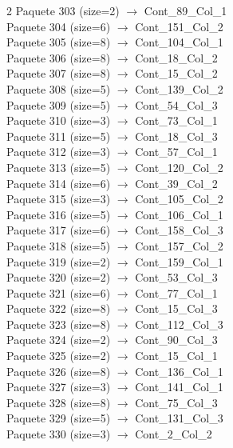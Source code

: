 \begin{multicols}{2}
Paquete 303 (size=2) $\rightarrow$ Cont\_89\_Col\_1\\
Paquete 304 (size=6) $\rightarrow$ Cont\_151\_Col\_2\\
Paquete 305 (size=8) $\rightarrow$ Cont\_104\_Col\_1\\
Paquete 306 (size=8) $\rightarrow$ Cont\_18\_Col\_2\\
Paquete 307 (size=8) $\rightarrow$ Cont\_15\_Col\_2\\
Paquete 308 (size=5) $\rightarrow$ Cont\_139\_Col\_2\\
Paquete 309 (size=5) $\rightarrow$ Cont\_54\_Col\_3\\
Paquete 310 (size=3) $\rightarrow$ Cont\_73\_Col\_1\\
Paquete 311 (size=5) $\rightarrow$ Cont\_18\_Col\_3\\
Paquete 312 (size=3) $\rightarrow$ Cont\_57\_Col\_1\\
Paquete 313 (size=5) $\rightarrow$ Cont\_120\_Col\_2\\
Paquete 314 (size=6) $\rightarrow$ Cont\_39\_Col\_2\\
Paquete 315 (size=3) $\rightarrow$ Cont\_105\_Col\_2\\
Paquete 316 (size=5) $\rightarrow$ Cont\_106\_Col\_1\\
Paquete 317 (size=6) $\rightarrow$ Cont\_158\_Col\_3\\
Paquete 318 (size=5) $\rightarrow$ Cont\_157\_Col\_2\\
Paquete 319 (size=2) $\rightarrow$ Cont\_159\_Col\_1\\
Paquete 320 (size=2) $\rightarrow$ Cont\_53\_Col\_3\\
Paquete 321 (size=6) $\rightarrow$ Cont\_77\_Col\_1\\
Paquete 322 (size=8) $\rightarrow$ Cont\_15\_Col\_3\\
Paquete 323 (size=8) $\rightarrow$ Cont\_112\_Col\_3\\
Paquete 324 (size=2) $\rightarrow$ Cont\_90\_Col\_3\\
Paquete 325 (size=2) $\rightarrow$ Cont\_15\_Col\_1\\
Paquete 326 (size=8) $\rightarrow$ Cont\_136\_Col\_1\\
Paquete 327 (size=3) $\rightarrow$ Cont\_141\_Col\_1\\
Paquete 328 (size=8) $\rightarrow$ Cont\_75\_Col\_3\\
Paquete 329 (size=5) $\rightarrow$ Cont\_131\_Col\_3\\
Paquete 330 (size=3) $\rightarrow$ Cont\_2\_Col\_2\\

\end{multicols}

